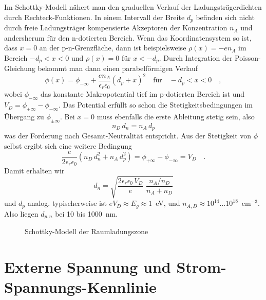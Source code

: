 Im Schottky-Modell nähert man den graduellen Verlauf der Ladungsträgerdichten durch Rechteck-Funktionen. In einem Intervall der Breite $d_p$ befinden sich nicht durch freie Ladungsträger kompensierte Akzeptoren der Konzentration $n_A$ und andersherum für den n-dotierten Bereich. Wenn das Koordinatensystem so ist, dass $x=0$ an der p-n-Grenzfläche, dann ist beispielsweise $\rho(x) = - e n_A$ im Bereich $- d_p < x < 0$ und  $\rho(x) =0$ für $x < -d_p$. Durch Integration der Poisson-Gleichung bekommt man dann einen parabelförmigen Verlauf 
\begin{equation}
    \phi(x) = \phi_{-\infty} + \frac{e n_A}{\epsilon_r \epsilon_0} \left( d_p + x \right)^2  \quad \text{für} \quad - d_p < x < 0 \quad ,
\end{equation}
wobei $\phi_{-\infty}$ das konstante Makropotential tief im p-dotierten Bereich ist und $V_D =  \phi_{+\infty} - \phi_{-\infty}$. Das Potential erfüllt so schon die Stetigkeitsbedingungen im Übergang zu $\phi_{\pm\infty}$. Bei $x=0$ muss ebenfalls die erste Ableitung  stetig sein, also
\begin{equation}
    n_D \, d_n = n_A \, d_p
\end{equation}
was der Forderung nach Gesamt-Neutralität entspricht. Aus der Stetigkeit von $\phi$ selbst ergibt sich eine weitere Bedingung
\begin{equation}
    \frac{e}{2 \epsilon_r \epsilon_0} \left(  n_D \, d_n^2  + n_A \,d_p^2 \right) =\phi_{+\infty} - \phi_{-\infty} = V_D \quad .
\end{equation}
Damit erhalten wir
\begin{equation}
    d_n = \sqrt{ \frac{{2 \epsilon_r \epsilon_0 \, V_D}}{e}   \, \, \frac{n_A / n_D}{n_A + n_D}}
\end{equation}
und $d_p$ analog. typischerweise ist $e V_D \approx E_g \approx 1 $~eV, und $n_{A,D} \approx 10^{14} \dots 10^{18}$~cm$^{-3}$. Also liegen $d_{p,n}$ bei 10 bis 1000~nm.


\begin{figure}
    \caption{Schottky-Modell der Raumladungszone}
\end{figure}

\section*{Externe Spannung und Strom-Spannungs-Kennlinie}

